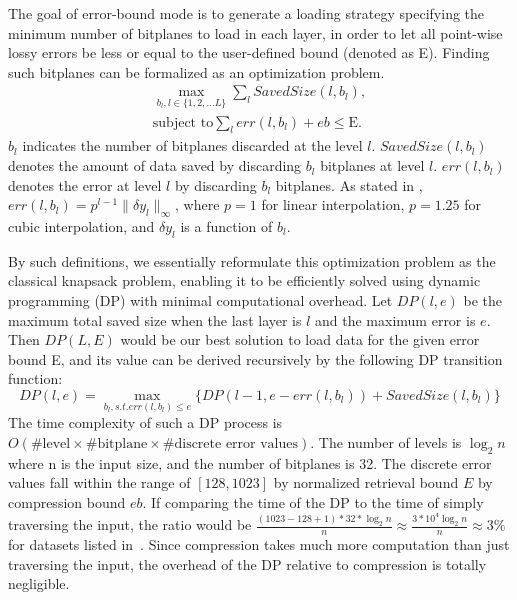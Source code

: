 The goal of error-bound mode is to generate a loading strategy specifying the minimum number of bitplanes to load in each layer, in order to let all point-wise lossy errors be less or equal to the user-defined bound (denoted as E). Finding such bitplanes can be formalized as an optimization problem.
\begin{gather*}
\max_{b_l, l \in \{1, 2, ... L\}}  \sum_l SavedSize(l, b_l), \\
\text{subject to}   \sum_l err(l,b_l) + eb \leq \text{E}.
\end{gather*}
$b_l$ indicates the number of bitplanes discarded at the level $l$. \linebreak $SavedSize(l,b_l)$ denotes the amount of data saved by discarding $b_l$ bitplanes at level $l$. $err(l,b_l)$ denotes the error at level $l$ by discarding $b_l$ bitplanes. 
As stated in , $err(l,b_l) = p^{l - 1}\|\delta y_{l}\|_\infty$, where $p = 1$ for linear interpolation, $p=1.25$ for cubic interpolation, and $\delta y_l$ is a function of $b_l$.

By such definitions, we essentially reformulate this optimization problem as the classical knapsack problem, enabling it to be efficiently solved using dynamic programming (DP) with minimal computational overhead.
Let $DP(l,e)$ be the maximum total saved size when the last layer is $l$ and the maximum error is $e$. Then $DP(L, E)$ would be our best solution to load data for the given error bound E, and its value can be derived recursively by the following DP transition function:
\[
DP(l,e) = \max_{b_l, s.t. err(l,b_l) \leq e }\{DP(l-1, e - err(l,b_l)) + SavedSize(l,b_l) \}
\]
The time complexity of such a DP process is $O( \text{\#level} \times \text{\#bitplane} \times \text{\#discrete error values})$. 
The number of levels is $\log_2 n$ where n is the input size, and the number of bitplanes is 32. The discrete error values fall within the range of $[128, 1023]$ by normalized retrieval bound $E$ by compression bound $eb$. If comparing the time of the DP to the time of simply traversing the input, the ratio would be 
$\frac{(1023-128+1)*32*\log_2 n}{n} \approx \frac{3*10^4\log_2 n}{n} \approx 3\%$ for datasets listed in~. Since compression takes much more computation than just traversing the input, the overhead of the DP relative to compression is totally negligible. 

